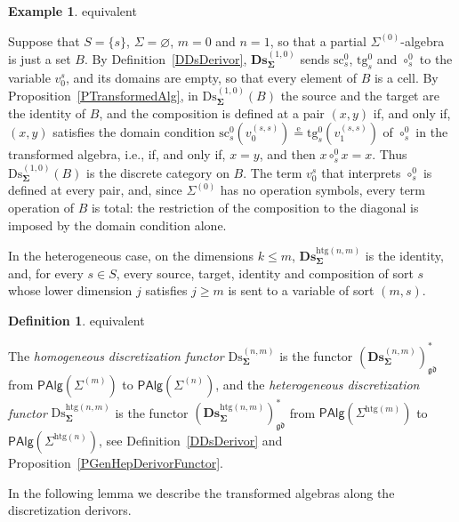 \documentclass[a4paper, reqno]{amsbook}
\makeatletter
\newcommand{\sig}[1]{\mathbf{#1}}             %
\newcommand{\eeq}{\overset{\mathrm e}{=}}      %
\newcommand{\gd}{\mathfrak{gd}}              %
\newcommand{\htg}{\mathrm{htg}}                %
\newcommand{\src}{\mathrm{sc}}
\newcommand{\tgt}{\mathrm{tg}}
\newcommand{\Ds}{\mathrm{Ds}}
\newcommand{\bDs}{\mathbf{Ds}}
\theoremstyle{plain}
\theoremstyle{definition}
\newtheorem{definition}[theorem]{Definition}
\newtheorem{example}[theorem]{Example}
\newcommand*{\CA@leanpending}{}
\newcommand*{\CA@leanrelation}{}
\newcommand*{\lean}[2]{%
  \ifcsname\string\color@lean@#1\endcsname\else
    \PackageError{main}{Unknown relation `#1' in \string\lean}{Use equivalent, weaker or stronger.}%
  \fi
  \gdef\CA@leanrelation{#1}%
  \gdef\CA@leanpending{#2}}
\makeatother
\begin{document}
\begin{example}\label{EDiscretizationDiagonal}\lean{equivalent}{Dimensions.Diagonal.composition_dom,Dimensions.Diagonal.no_term_domain}
Suppose that $S=\{s\}$, $\Sigma=\varnothing$, $m=0$ and $n=1$, so that a partial $\Sigma^{(0)}$-algebra is just a set $B$.
By Definition~\ref{DDsDerivor}, $\bDs^{(1,0)}_{\sig{\Sigma}}$ sends $\src^{0}_{s}$, $\tgt^{0}_{s}$ and $\circ^{0}_{s}$ to the variable $v^{s}_{0}$, and its domains are empty, so that every element of $B$ is a cell.
By Proposition~\ref{PTransformedAlg}, in $\Ds^{(1,0)}_{\sig{\Sigma}}(B)$ the source and the target are the identity of $B$, and the composition is defined at a pair $(x,y)$ if, and only if, $(x,y)$ satisfies the domain condition $\src^{0}_{s}(v^{(s,s)}_{0})\eeq\tgt^{0}_{s}(v^{(s,s)}_{1})$ of $\circ^{0}_{s}$ in the transformed algebra, i.e., if, and only if, $x=y$, and then $x\circ^{0}_{s}x=x$.
Thus $\Ds^{(1,0)}_{\sig{\Sigma}}(B)$ is the discrete category on $B$.
The term $v^{s}_{0}$ that interprets $\circ^{0}_{s}$ is defined at every pair, and, since $\Sigma^{(0)}$ has no operation symbols, every term operation of $B$ is total: the restriction of the composition to the diagonal is imposed by the domain condition alone.
\end{example}

In the heterogeneous case, on the dimensions $k\leq m$, $\bDs^{\htg(n,m)}_{\sig{\Sigma}}$ is the identity, and, for every $s\in S$, every source, target, identity and composition of sort $s$ whose lower dimension $j$ satisfies $j\geq m$ is sent to a variable of sort $(m,s)$.

\begin{definition}\label{DDsFunctor}\lean{equivalent}{Dimensions.homogeneousDiscretizationPartialFunctor,Dimensions.heterogeneousDiscretizationPartialFunctor}
The \emph{homogeneous discretization functor} $\Ds^{(n,m)}_{\sig{\Sigma}}$ is the functor $(\bDs^{(n,m)}_{\sig{\Sigma}})^{\ast}_{\gd}$ from $\mathsf{PAlg}(\Sigma^{(m)})$ to $\mathsf{PAlg}(\Sigma^{(n)})$, and the \emph{heterogeneous discretization functor} $\Ds^{\htg(n,m)}_{\sig{\Sigma}}$ is the functor $(\bDs^{\htg(n,m)}_{\sig{\Sigma}})^{\ast}_{\gd}$ from $\mathsf{PAlg}(\Sigma^{\htg(m)})$ to $\mathsf{PAlg}(\Sigma^{\htg(n)})$, see Definition~\ref{DDsDerivor} and Proposition~\ref{PGenHepDerivorFunctor}.
\end{definition}

In the following lemma we describe the transformed algebras along the discretization derivors.
\end{document}

